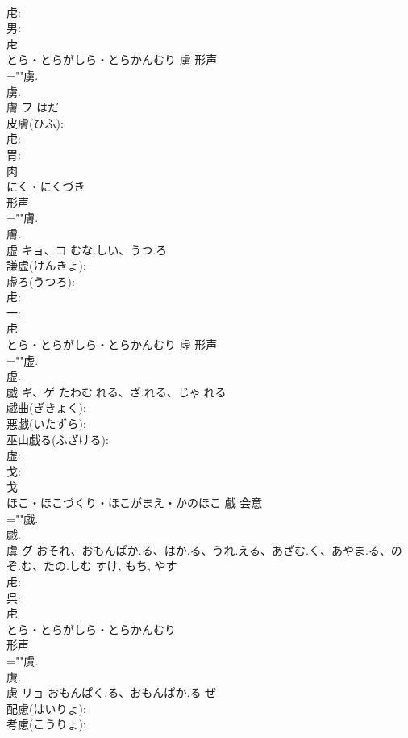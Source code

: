 \documentclass[8pt]{extreport}
\begin{document}
\begin{CJK}{UTF8}{min}
\\	虍: 
\\	男: 
\\	虍	
\\	とら・とらがしら・とらかんむり	虜	形声 
\\	=""虜.
\\	虜.
\\	膚	フ	はだ		
\\	皮膚(ひふ): 
\\	虍: 
\\	胃: 
\\	肉	
\\	にく・にくづき	
\\	形声 
\\	=""膚.
\\	膚.
\\	虚	キョ、コ	むな.しい、うつ.ろ		
\\	謙虚(けんきょ): 
\\	虚ろ(うつろ): 
\\	虍: 
\\	一: 
\\	虍	
\\	とら・とらがしら・とらかんむり	虛	形声 
\\	=""虚.
\\	虚.
\\	戯	ギ、ゲ	たわむ.れる、ざ.れる、じゃ.れる		
\\	戯曲(ぎきょく): 
\\	悪戯(いたずら): 
\\	巫山戯る(ふざける): 
\\	虚: 
\\	戈: 
\\	戈	
\\	ほこ・ほこづくり・ほこがまえ・かのほこ	戲	会意 
\\	=""戯.
\\	戯.
\\	虞	グ	おそれ、おもんぱか.る、はか.る、うれ.える、あざむ.く、あやま.る、のぞ.む、たの.しむ	すけ, もち, やす	
\\	虍: 
\\	呉: 
\\	虍	
\\	とら・とらがしら・とらかんむり	
\\	形声 
\\	=""虞.
\\	虞.
\\	慮	リョ	おもんぱく.る、おもんぱか.る	ぜ	
\\	配慮(はいりょ): 
\\	考慮(こうりょ): 

\end{CJK}
\end{document}
